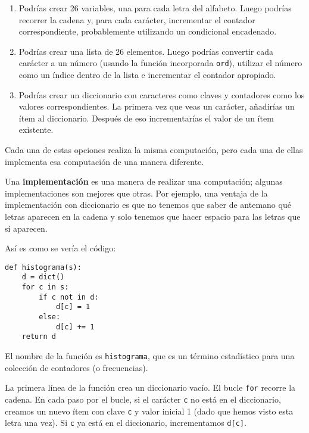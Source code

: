 \documentclass[10pt]{book}
\begin{document}
\begin{enumerate}

\item Podrías crear 26 variables, una para cada letra del
alfabeto.  Luego podrías recorrer la cadena y, para cada
carácter, incrementar el contador correspondiente, probablemente utilizando
un condicional encadenado.

\item Podrías crear una lista de 26 elementos.  Luego podrías
convertir cada carácter a un número (usando la función incorporada
{\tt ord}), utilizar el número como un índice dentro de la lista e incrementar
el contador apropiado.

\item Podrías crear un diccionario con caracteres como claves
y contadores como los valores correspondientes.  La primera vez que
veas un carácter, añadirías un ítem al diccionario.  Después
de eso incrementarías el valor de un ítem existente.

\end{enumerate}

Cada una de estas opciones realiza la misma computación, pero cada una
de ellas implementa esa computación de una manera diferente.

Una {\bf implementación} es una manera de realizar una computación;
algunas implementaciones son mejores que otras.  Por ejemplo,
una ventaja de la implementación con diccionario es que no
tenemos que saber de antemano qué letras aparecen en la cadena
y solo tenemos que hacer espacio para las letras que sí aparecen.

Así es como se vería el código:

\begin{verbatim}
def histograma(s):
    d = dict()
    for c in s:
        if c not in d:
            d[c] = 1
        else:
            d[c] += 1
    return d
\end{verbatim}
%
El nombre de la función es {\tt histograma}, que es un término
estadístico para una colección de contadores (o frecuencias).

La primera línea de la
función crea un diccionario vacío.  El bucle {\tt for} recorre
la cadena.  En cada paso por el bucle, si el carácter {\tt c} no
está en el diccionario, creamos un nuevo ítem con clave {\tt c} y
valor inicial 1 (dado que hemos visto esta letra una vez).  Si {\tt c}
ya está en el diccionario, incrementamos {\tt d[c]}.
\end{document}
